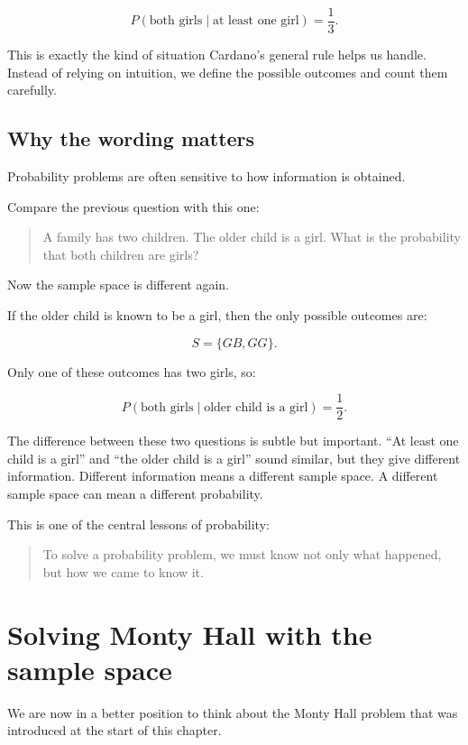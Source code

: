 \documentclass[
  letterpaper,
  DIV=11,
  numbers=noendperiod]{scrreprt}
\begin{document}
\[
P(\text{both girls} \mid \text{at least one girl}) = \frac{1}{3}.
\]

This is exactly the kind of situation Cardano's general rule helps us
handle. Instead of relying on intuition, we define the possible outcomes
and count them carefully.

\subsection{Why the wording matters}\label{why-the-wording-matters}

Probability problems are often sensitive to how information is obtained.

Compare the previous question with this one:

\begin{quote}
A family has two children. The older child is a girl. What is the
probability that both children are girls?
\end{quote}

Now the sample space is different again.

If the older child is known to be a girl, then the only possible
outcomes are:

\[
S = \{GB, GG\}.
\]

Only one of these outcomes has two girls, so:

\[
P(\text{both girls} \mid \text{older child is a girl}) = \frac{1}{2}.
\]

The difference between these two questions is subtle but important. ``At
least one child is a girl'' and ``the older child is a girl'' sound
similar, but they give different information. Different information
means a different sample space. A different sample space can mean a
different probability.

This is one of the central lessons of probability:

\begin{quote}
To solve a probability problem, we must know not only what happened, but
how we came to know it.
\end{quote}

\section{Solving Monty Hall with the sample
space}\label{solving-monty-hall-with-the-sample-space}

We are now in a better position to think about the Monty Hall problem
that was introduced at the start of this chapter.
\end{document}
